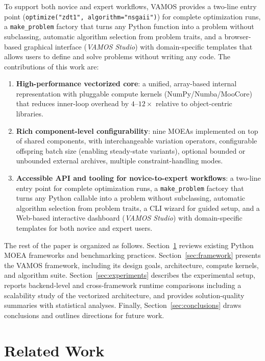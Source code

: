 \documentclass[journal]{IEEEtran}
\newcommand{\VAMOS}{VAMOS}
\begin{document}
To support both novice and expert workflows, \VAMOS{} provides a two-line entry point (\texttt{optimize("zdt1", algorithm="nsgaii")}) for complete optimization runs, a \texttt{make\_problem} factory that turns any Python function into a problem without subclassing, automatic algorithm selection from problem traits, and a browser-based graphical interface (\emph{VAMOS Studio}) with domain-specific templates that allows users to define and solve problems without writing any code. The contributions of this work are:
\begin{enumerate}
  \item \textbf{High-performance vectorized core}: a unified, array-based internal representation with pluggable compute kernels (NumPy/Numba/MooCore) that reduces inner-loop overhead by $4$--$12\times$ relative to object-centric libraries.
  \item \textbf{Rich component-level configurability}: nine MOEAs implemented on top of shared components, with interchangeable variation operators, configurable offspring batch size (enabling steady-state variants), optional bounded or unbounded external archives, multiple constraint-handling modes.
  \item \textbf{Accessible API and tooling for novice-to-expert workflows}: a two-line entry point for complete optimization runs, a \texttt{make\_problem} factory that turns any Python callable into a problem without subclassing, automatic algorithm selection from problem traits, a CLI wizard for guided setup, and a Web-based interactive dashboard (\emph{\VAMOS{} Studio}) with domain-specific templates for both novice and expert users.
\end{enumerate}

The rest of the paper is organized as follows. Section~\ref{sec:related} reviews existing Python MOEA frameworks and benchmarking practices. Section~\ref{sec:framework} presents the \VAMOS{} framework, including its design goals, architecture, compute kernels, and algorithm suite. Section~\ref{sec:experiments} describes the experimental setup, reports backend-level and cross-framework runtime comparisons including a scalability study of the vectorized architecture, and provides solution-quality summaries with statistical analyses. Finally, Section~\ref{sec:conclusions} draws conclusions and outlines directions for future work.

\section{Related Work}
\label{sec:related}
\end{document}
